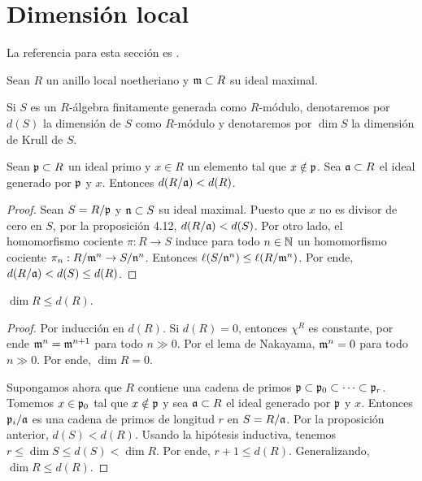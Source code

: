 \section{Dimensión local}

\noindent La referencia para esta sección es \cite[pp. 120-121]{atiyah}.

\begin{preliminaries}
Sean $R$ un anillo local noetheriano y $\mathfrak m \subset R$ su ideal maximal.
\end{preliminaries}

\begin{notation}
Si $S$ es un $R$-álgebra finitamente generada como $R$-módulo, denotaremos por $d(S)$ la dimensión de $S$ como $R$-módulo y denotaremos por $\dim S$ la dimensión de Krull de $S$.
\end{notation}

\begin{proposition}
Sean $\mathfrak p \subset R$ un ideal primo y $x \in R$ un elemento tal que $x \notin \mathfrak p$. Sea $\mathfrak a \subset R$ el ideal generado por $\mathfrak p$ y $x$. Entonces $d(R/\mathfrak a) < d(R)$.
\end{proposition}

\begin{proof}
Sean $S = R/\mathfrak p$ y $\mathfrak n \subset S$ su ideal maximal. Puesto que $x$ no es divisor de cero en $S$, por la proposición 4.12, $d(R/\mathfrak a) < d(S)$. Por otro lado, el homomorfismo cociente $\pi : R \to S$ induce para todo $n \in \mathbb N$ un homomorfismo cociente $\pi_n : R/\mathfrak m^n \to S/\mathfrak n^n$. Entonces $\ell(S/\mathfrak n^n) \le \ell(R/\mathfrak m^n)$. Por ende, $d(R/\mathfrak a) < d(S) \le d(R)$.
\end{proof}

\begin{proposition}
$\dim R \le d(R)$.
\end{proposition}

\begin{proof}
Por inducción en $d(R)$. Si $d(R) = 0$, entonces $\chi^R$ es constante, por ende $\mathfrak m^n = \mathfrak m^{n+1}$ para todo $n \gg 0$. Por el lema de Nakayama, $\mathfrak m^n = 0$ para todo $n \gg 0$. Por ende, $\dim R = 0$.

Supongamos ahora que $R$ contiene una cadena de primos $\mathfrak p \subset \mathfrak p_0 \subset \dots \subset \mathfrak p_r$. Tomemos $x \in \mathfrak p_0$ tal que $x \notin \mathfrak p$ y sea $\mathfrak a \subset R$ el ideal generado por $\mathfrak p$ y $x$. Entonces $\mathfrak p_i/\mathfrak a$ es una cadena de primos de longitud $r$ en $S = R/\mathfrak a$. Por la proposición anterior, $d(S) < d(R)$. Usando la hipótesis inductiva, tenemos $r \le \dim S \le d(S) < \dim R$. Por ende, $r + 1 \le d(R)$. Generalizando, $\dim R \le d(R)$.
\end{proof}

